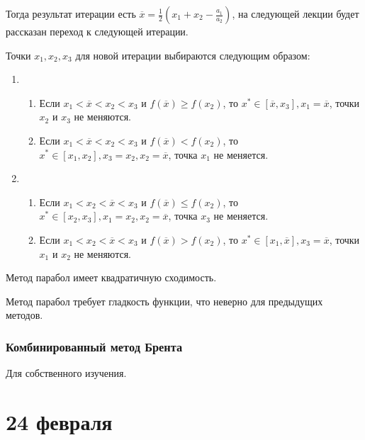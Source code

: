Тогда результат итерации есть \(\overline x = \frac{1}{2} \left( x_1 + x_2 - \frac{a_1}{a_2} \right)\), на следующей лекции будет рассказан переход к следующей итерации.

Точки \(x_1, x_2, x_3\) для новой итерации выбираются следующим образом:
\begin{enumerate}
    \item \begin{enumerate}
              \item Если \(x_1 < \overline x < x_2 < x_3\) и \(f(\overline x) \geq f(x_2)\), то \(x^* \in [\overline x, x_3], x_1 = \overline x\), точки \(x_2\) и \(x_3\) не меняются.
              \item Если \(x_1 < \overline x < x_2 < x_3\) и \(f(\overline x) < f(x_2)\), то \(x^* \in [x_1, x_2], x_3 = x_2, x_2 = \overline x\), точка \(x_1\) не меняется.
          \end{enumerate}
    \item \begin{enumerate}
              \item Если \(x_1 < x_2 < \overline x < x_3\) и \(f(\overline x) \leq f(x_2)\), то \(x^* \in [x_2, x_3], x_1 = x_2, x_2 = \overline x\), точка \(x_3\) не меняется.
              \item Если \(x_1 < x_2 < \overline x < x_3\) и \(f(\overline x) > f(x_2)\), то \(x^* \in [x_1, \overline x], x_3 = \overline x\), точки \(x_1\) и \(x_2\) не меняются.
          \end{enumerate}
\end{enumerate}

\begin{remark}
    Метод парабол имеет квадратичную сходимость.
\end{remark}

\begin{remark}
    Метод парабол требует гладкость функции, что неверно для предыдущих методов.
\end{remark}

\subsection{Комбинированный метод Брента}

Для собственного изучения.

\chapter{24 февраля}

